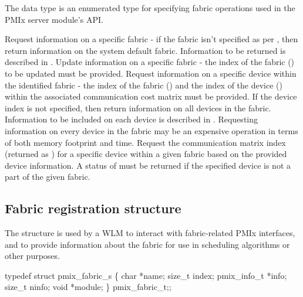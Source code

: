 The  data type is an enumerated type for specifying fabric operations used in the \ac{PMIx} server module's  \ac{API}.

\begin{constantdesc}
%
Request information on a specific fabric - if the fabric isn't specified as per , then return information on the system default fabric. Information to be returned is described in .
%
Update information on a specific fabric - the index of the fabric () to be updated must be provided.
%
Request information on a specific device within the identified fabric - the index of the fabric () and the index of the device () within the associated communication cost matrix must be provided. If the device index is not specified, then return information on all devices in the fabric. Information to be included on each device is described in .
%
\adviceuserstart
Requesting information on every device in the fabric may be an expensive operation in terms of both memory footprint and time.
\adviceuserend
%
Request the communication matrix index (returned as ) for a specific device within a given fabric based on the provided device information. A status of  must be returned if the specified device is not a part of the given fabric.
%
\end{constantdesc}

\subsection{Fabric registration structure}

The  structure is used by a \ac{WLM} to interact with fabric-related \ac{PMIx} interfaces, and to provide information about the fabric for use in scheduling algorithms or other purposes.

\cspecificstart
\begin{codepar}
typedef struct pmix_fabric_s \{
    char *name;
    size_t index;
    pmix_info_t *info;
    size_t ninfo;
    void *module;
\} pmix_fabric_t;;
\end{codepar}
\cspecificend

